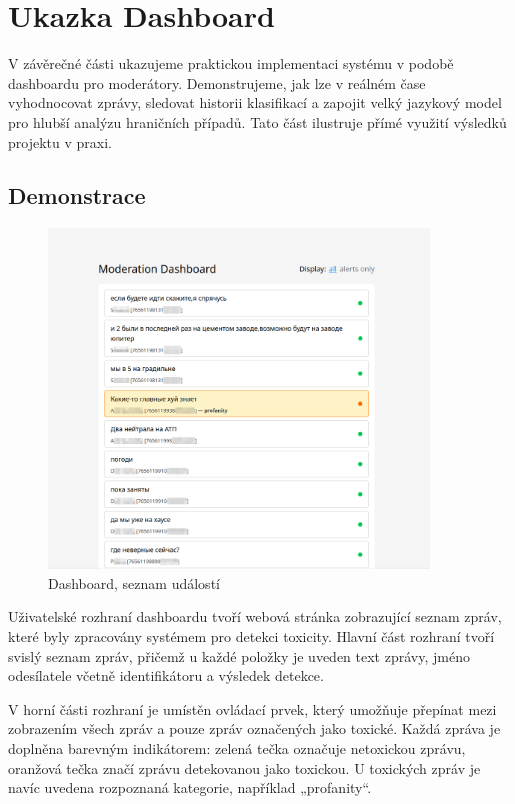 \documentclass[FM,Proj]{tulthesis}
\begin{document}
\chapter{ Ukazka Dashboard}
V závěrečné části ukazujeme praktickou implementaci systému v podobě dashboardu pro moderátory. Demonstrujeme, jak lze v reálném čase vyhodnocovat zprávy, sledovat historii klasifikací a zapojit velký jazykový model pro hlubší analýzu hraničních případů. Tato část ilustruje přímé využití výsledků projektu v praxi.

\section{Demonstrace}

\begin{figure}[ht]
    \centering
    \includegraphics[width=0.9\textwidth]{dash-screenshot.png}
    \caption{Dashboard, seznam událostí}
    \label{fig:dashboard-main}
\end{figure}

Uživatelské rozhraní dashboardu tvoří webová stránka zobrazující seznam zpráv, které byly zpracovány systémem pro detekci toxicity. Hlavní část rozhraní tvoří svislý seznam zpráv, přičemž u každé položky je uveden text zprávy, jméno odesílatele včetně identifikátoru a výsledek detekce.

V horní části rozhraní je umístěn ovládací prvek, který umožňuje přepínat mezi zobrazením všech zpráv a pouze zpráv označených jako toxické. Každá zpráva je doplněna barevným indikátorem: zelená tečka označuje netoxickou zprávu, oranžová tečka značí zprávu detekovanou jako toxickou. U toxických zpráv je navíc uvedena rozpoznaná kategorie, například „profanity“.
\end{document}
